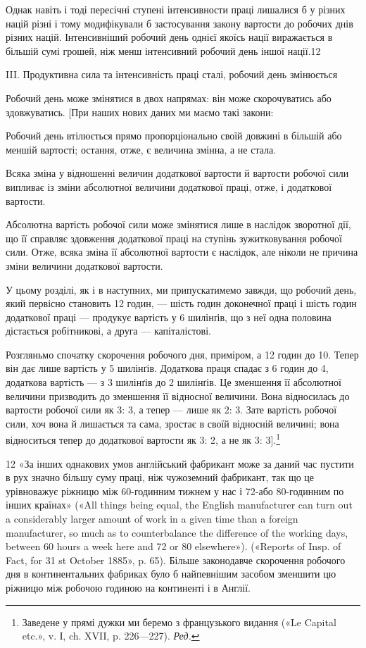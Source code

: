 \parcont{}  %
Однак навіть і тоді пересічні ступені інтенсивности праці лишалися
б у різних націй різні і тому модифікували б застосування
закону вартости до робочих днів різних націй. Інтенсивніший
робочий день однієї якоїсь нації виражається в більшій сумі
грошей, ніж менш інтенсивний робочий день іншої нації.12

III. Продуктивна сила та інтенсивність праці сталі, робочий
день змінюється

Робочий день може змінятися в двох напрямах: він може
скорочуватись або здовжуватись. [При наших нових даних ми
маємо такі закони:

Робочий день втілюється прямо пропорціонально своїй довжині
в більшій або меншій вартості; остання, отже, є величина
змінна, а не стала.

Всяка зміна у відношенні величин додаткової вартости й вартости
робочої сили випливає із зміни абсолютної величини додаткової
праці, отже, і додаткової вартости.

Абсолютна вартість робочої сили може змінятися лише в
наслідок зворотної дії, що її справляє здовження додаткової
праці на ступінь зужитковування робочої сили. Отже, всяка зміна
її абсолютної вартости є наслідок, але ніколи не причина зміни
величини додаткової вартости.

У цьому розділі, як і в наступних, ми припускатимемо завжди,
що робочий день, який первісно становить 12 годин, — шість
годин доконечної праці і шість годин додаткової праці — продукує
вартість у 6 шилінґів, що з неї одна половина дістається
робітникові, а друга — капіталістові.

Розгляньмо спочатку скорочення робочого дня, приміром,
а 12 годин до 10. Тепер він дає лише вартість у 5 шилінґів. Додаткова
праця спадає з 6 годин до 4, додаткова вартість — з 3 шилінґів
до 2 шилінґів. Це зменшення її абсолютної величини
призводить до зменшення її відносної величини. Вона відносилась
до вартости робочої сили як 3: 3, а тепер — лише як 2: 3. Зате
вартість робочої сили, хоч вона й лишається та сама, зростає
в своїй відносній величині; вона відноситься тепер до додаткової
вартости як 3: 2, а не як 3: 3].\footnote*{
Заведене у прямі дужки ми беремо з французького видання («Le
Capital etc.», v. І, ch. XVII, p. 226—227). \emph{Ред.}
}

12 «За інших однакових умов англійський фабрикант може за даний
час пустити в рух значно більшу суму праці, ніж чужоземний фабрикант,
так що це урівноважує ріжницю між 60-годинним тижнем у нас
і 72-або 80-годинним по інших країнах» («All things being equal,
the English manufacturer can turn out a considerably larger amount of
work in a given time than a foreign manufacturer, so much as to counterbalance
the difference of the working days, between 60 hours a week here
and 72 or 80 elsewhere»). («Reports of Insp. of Fact, for 31 st October 1885»,
p. 65). Більше законодавче скорочення робочого дня в континентальних
фабриках було б найпевнішим засобом зменшити цю ріжницю між робочою
годиною на континенті і в Англії.
\parbreak{}  %
